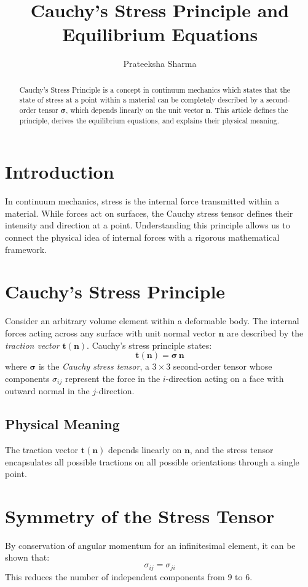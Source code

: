 \documentclass[12pt,a4paper]{article}
\title{\textbf{Cauchy’s Stress Principle and Equilibrium Equations}}
\author{Prateeksha Sharma}
\date{}
\begin{document}
\maketitle

\begin{abstract}
Cauchy’s Stress Principle is a concept in continuum mechanics which states that the state of stress at a point within a material can be completely described by a second-order tensor $\bm{\sigma}$, which depends linearly on the unit vector $\mathbf{n}$. This article defines the principle, derives the equilibrium equations, and explains their physical meaning.
\end{abstract}

\section{Introduction}
In continuum mechanics, stress is the internal force transmitted within a material. While forces act on surfaces, the Cauchy stress tensor defines their intensity and direction at a point. Understanding this principle allows us to connect the physical idea of internal forces with a rigorous mathematical framework.

\section{Cauchy’s Stress Principle}
Consider an arbitrary volume element within a deformable body. The internal forces acting across any surface with unit normal vector $\mathbf{n}$ are described by the \textit{traction vector} $\mathbf{t}(\mathbf{n})$. Cauchy’s stress principle states:
\begin{equation}
    \mathbf{t}(\mathbf{n}) = \bm{\sigma} \, \mathbf{n}
\end{equation}
where $\bm{\sigma}$ is the \textit{Cauchy stress tensor}, a $3\times 3$ second-order tensor whose components $\sigma_{ij}$ represent the force in the $i$-direction acting on a face with outward normal in the $j$-direction.

\subsection{Physical Meaning}
The traction vector $\mathbf{t}(\mathbf{n})$ depends linearly on $\mathbf{n}$, and the stress tensor encapsulates all possible tractions on all possible orientations through a single point.

\section{Symmetry of the Stress Tensor}
By conservation of angular momentum for an infinitesimal element, it can be shown that:
\begin{equation}
    \sigma_{ij} = \sigma_{ji}
\end{equation}
This reduces the number of independent components from $9$ to $6$.
\end{document}
